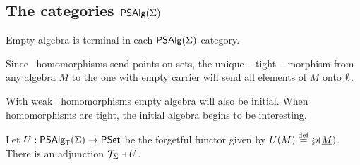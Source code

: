 \documentclass[10pt]{article}
\begin{document}

\subsection{The categories $\mbox{\sf PSAlg}(\Sigma)$}

\begin{Fact}
\label{le:terMAPS}
Empty algebra is terminal in each $\mbox{\sf PSAlg}(\Sigma)$ category.
\end{Fact}

\begin{Proof}
Since \PS\ homomorphisms send points on sets, the unique -- tight --
morphism from any algebra $M$ to the one with empty carrier will send
all elements of $M$ onto $\emptyset$.
\end{Proof}


\noindent
With weak \PS\ homomorphisms empty algebra will also be initial.
When homomorphisms are tight, the initial algebra begins to be interesting.

\begin{Lemma}
\label{le:MAPStADJ}
Let $U:\mbox{\sf PSAlg}_{\sf T}(\Sigma)\rightarrow\mbox{\rm\sf PSet}$ be the forgetful functor given by
$U(M)\stackrel{{\rm \tiny{def}}}=\wp(\underline {M})$.  There is an adjunction ${\cal T}_{\Sigma}\mathrel{\scriptstyle\dashv} U$.
\end{Lemma}
\end{document}
